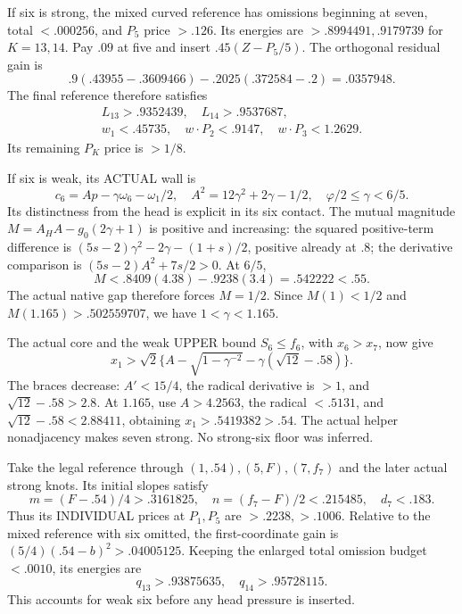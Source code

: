 \documentclass[11pt]{article}
\theoremstyle{definition}
\theoremstyle{remark}
\begin{document}
If six is strong, the mixed curved reference has omissions beginning
at seven, total \(<.000256\), and \(P_5\) price \(>.126\).
Its energies are \(>.8994491,.9179739\) for \(K=13,14\).
Pay \(.09\) at five and insert \(.45(Z-P_5/5)\).
The orthogonal residual gain is
\[
             .9(.43955-.3609466)-.2025(.372584-.2)=.0357948 .
\]
The final reference therefore satisfies
\[
\begin{gathered}
 L_{13}>.9352439,\quad L_{14}>.9537687,\\
 w_1<.45735,\quad w\cdot P_2<.9147,\quad w\cdot P_3<1.2629 .
\tag{D19eightstrong}\label{app:exact19:eq:Deightstrong}
\end{gathered}
\]
Its remaining \(P_K\) price is \(>1/8\).

If six is weak, its ACTUAL wall is
\[
 c_6=Ap-\gamma\omega_6-\omega_1/2,\quad
 A^2=12\gamma^2+2\gamma-1/2,\quad \varphi/2\le\gamma<6/5 .
\]
Its distinctness from the head is explicit in its six contact.
The mutual magnitude \(M=A_HA-g_0(2\gamma+1)\) is positive and
increasing: the squared positive-term difference is
\((5s-2)\gamma^2-2\gamma-(1+s)/2\), positive already at \(.8\);
the derivative comparison is \((5s-2)A^2+7s/2>0\).
At \(6/5\),
\[
                          M<.8409(4.38)-.9238(3.4)=.542222<.55 .
\]
The actual native gap therefore forces \(M=1/2\).
Since \(M(1)<1/2\) and \(M(1.165)>.502559707\), we have
\(1<\gamma<1.165\).

The actual core and the weak UPPER bound \(S_6\le f_6\), with
\(x_6>x_7\), now give
\[
 x_1>\sqrt2\{A-\sqrt{1-\gamma^{-2}}-\gamma(\sqrt{12}-.58)\}.
\]
The braces decrease: \(A'<15/4\), the radical derivative is \(>1\),
and \(\sqrt{12}-.58>2.8\).
At \(1.165\), use \(A>4.2563\), the radical \(<.5131\), and
\(\sqrt{12}-.58<2.88411\), obtaining \(x_1>.5419382>.54\).
The actual helper nonadjacency makes seven strong.
No strong-six floor was inferred.

Take the legal reference through
\((1,.54),(5,F),(7,f_7)\) and the later actual strong knots.
Its initial slopes satisfy
\[
 m=(F-.54)/4>.3161825,\quad n=(f_7-F)/2<.215485,\quad d_7<.183 .
\]
Thus its INDIVIDUAL prices at \(P_1,P_5\) are \(>.2238,>.1006\).
Relative to the mixed reference with six omitted, the first-coordinate
gain is \((5/4)(.54-b)^2>.04005125\).
Keeping the enlarged total omission budget \(<.0010\), its energies are
\[
                         q_{13}>.93875635,\quad q_{14}>.95728115 .
\]
This accounts for weak six before any head pressure is inserted.
\end{document}
